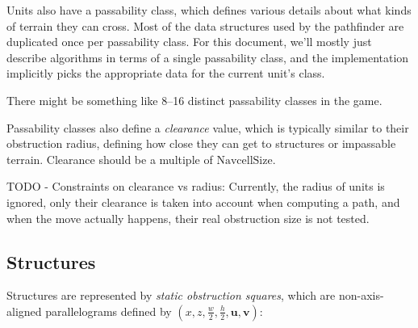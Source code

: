 \documentclass[a4paper,10pt]{article}
\begin{document}
Units also have a passability class,
which defines various details about what kinds of terrain they can cross.
Most of the data structures used by the pathfinder are
duplicated once per passability class.
For this document, we'll mostly just describe algorithms in terms of a single passability class,
and the implementation implicitly picks the appropriate data for the current unit's class.

There might be something like 8--16 distinct passability classes in the game.

Passability classes also define a \emph{clearance} value,
which is typically similar to their obstruction radius,
defining how close they can get to structures or impassable terrain.
Clearance should be a multiple of $\mathrm{NavcellSize}$.

TODO - Constraints on clearance vs radius: Currently, the radius of units is ignored, only their clearance is taken into account when computing a path, and when the move actually happens, their real obstruction size is not tested.

\subsection{Structures}

Structures are represented by \emph{static obstruction squares},
which are non-axis-aligned parallelograms
defined by $(x, z, \frac{w}{2}, \frac{h}{2}, \mathbf{u}, \mathbf{v})$:

\end{document}
